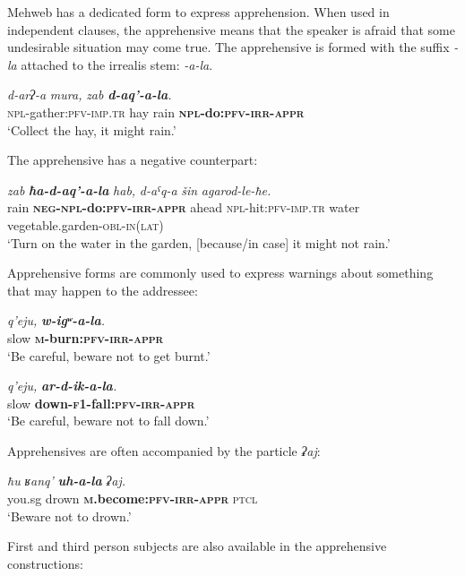 ﻿\documentclass[output=paper]{langsci/langscibook}
\begin{document}

Mehweb has a dedicated form to express apprehension. When used in
independent clauses, the apprehensive means that the speaker is afraid
that some undesirable situation may come true. The apprehensive is
formed with the suffix \emph{-la} attached to the irrealis stem:
\emph{-a-la}.

\ea %
\gll \emph{d-arʔ-a} \emph{mura,} \emph{zab} \emph{\textbf{d-aq'-a-la}.}\\
 \textsc{npl}-gather:\textsc{pfv}-\textsc{imp}.\textsc{tr} hay rain \textbf{\textsc{npl}-do:\textsc{pfv}-\textsc{irr}-\textsc{appr}}\\
\glt `Collect the hay, it might rain.'
\z


The apprehensive has a negative counterpart:

\ea %
\gll \emph{zab} \emph{\textbf{ħa-d-aq'-a-la}} \emph{hab,} \emph{d-aˤq-a} \emph{šin} \emph{agarod-le-ħe.}\\
 rain \textbf{\textsc{neg}-\textsc{npl}-do:\textsc{pfv}-\textsc{irr}-\textsc{appr}} ahead \textsc{npl}-hit:\textsc{pfv}-\textsc{imp}.\textsc{tr} water vegetable.garden-\textsc{obl}-\textsc{in}(\textsc{lat}) \\
\glt `Turn on the water in the garden, [because/in case] it might not
rain.' 
\z

Apprehensive forms are commonly used to express warnings about something
that may happen to the addressee:

\ea %
\gll \emph{q'eju,} \emph{\textbf{w-igʷ-a-la}.}\\
 slow \textbf{\textsc{m}-burn:\textsc{pfv}-\textsc{irr}-\textsc{appr}}\\
\glt `Be careful, beware not to get burnt.'

\ex %
\gll \emph{q'eju,} \emph{\textbf{ar-d-ik-a-la}.}\\
 slow \textbf{down-\textsc{f1}-fall:\textsc{pfv}-\textsc{irr}-\textsc{appr}}\\
\glt `Be careful, beware not to fall down.'
\z

Apprehensives are often accompanied by the particle \emph{ʡaj}:

\ea %
\gll \emph{ħu} \emph{ʁanq'} \emph{\textbf{uh-a-la}} \emph{ʡaj.}\\
 you.sg drown \textbf{\textsc{m}.become:\textsc{pfv}-\textsc{irr}-\textsc{appr}} \textsc{ptcl}\\
\glt `Beware not to drown.'
\z

First and third person subjects are also available in the apprehensive
constructions:
\end{document}
